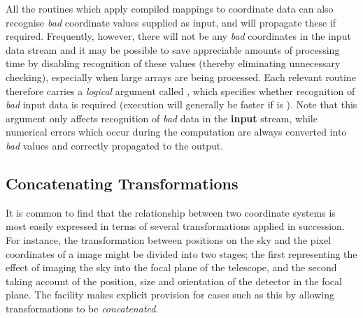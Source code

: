 All the routines which apply compiled mappings to coordinate data can also
recognise {\em bad} coordinate values supplied as input, and will propagate
these if required. 
Frequently, however, there will not be any {\em bad} coordinates in the
input data stream and it may be possible to save appreciable amounts of
processing time by disabling recognition of these values (thereby
eliminating unnecessary checking), especially when large arrays are being
processed. 
Each relevant routine therefore carries a {\em logical} argument called
, which specifies whether recognition of {\em bad} input data
is required (execution will generally be faster if  is
). 
Note that this argument only affects recognition of {\em bad} data in the
{\bf input} stream, while numerical errors which occur during the
computation are always converted into {\em bad} values and correctly
propagated to the output. 


\subsection{Concatenating Transformations}

\label{section:additional:concatenate}

It is common to find that the relationship between two coordinate systems is
most easily expressed in terms of several transformations applied in
succession. 
For instance, the transformation between positions on the sky and the pixel
coordinates of a  image might be divided into two stages; the
first representing the effect of imaging the sky into the focal plane of the
telescope, and the second taking account of the position, size and
orientation of the detector in the focal plane. 
The  facility makes explicit provision for cases such as
this by allowing transformations to be {\em concatenated}. 

